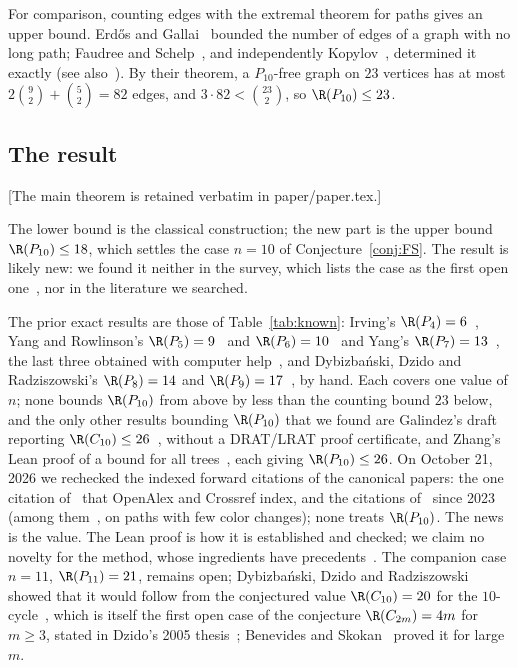 For comparison, counting edges with the extremal theorem for paths gives
an upper bound. Erdős and Gallai~\cite{EG59} bounded the number of edges
of a graph with no long path; Faudree and Schelp~\cite{FS75}, and
independently Kopylov~\cite{Kop77}, determined it exactly (see
also~\cite[Theorem~4]{DDR16}). By their theorem, a $P_{10}$-free graph on $23$ vertices has at most
$2\binom92+\binom52=82$ edges, and $3\cdot 82<\binom{23}{2}$, so
$\R(P_{10})\le 23$.

\subsection{The result}

[The main theorem is retained verbatim in paper/paper.tex.]

The lower bound is the classical construction; the new part is the upper
bound $\R(P_{10})\le18$, which settles the case $n=10$ of
Conjecture~\ref{conj:FS}. The result is likely new: we found it neither
in the survey, which lists the case as the first open
one~\cite[Section~6.4]{Rad26}, nor in the literature we searched.

The prior exact results are those of Table~\ref{tab:known}: Irving's
$\R(P_4)=6$~\cite{Irv74}, Yang and Rowlinson's $\R(P_5)=9$~\cite{YR94} and
$\R(P_6)=10$~\cite{YR92} and Yang's $\R(P_7)=13$~\cite{Yan95}, the last
three obtained with computer help~\cite[Section~2]{DDR16}, and
Dybizbański, Dzido and Radziszowski's $\R(P_8)=14$ and
$\R(P_9)=17$~\cite{DDR16}, by hand. Each covers one value of $n$; none
bounds $\R(P_{10})$ from above by less than the counting bound $23$ below,
and the only other results bounding $\R(P_{10})$ that we found are
Galindez's draft reporting $\R(C_{10})\le26$~\cite{Gal26}, without a
DRAT/LRAT proof certificate, and Zhang's Lean
proof of a bound for all trees~\cite{ZhJ26}, each giving
$\R(P_{10})\le26$. On October
21, 2026 we rechecked the indexed forward citations of the canonical
papers: the one citation of~\cite{DDR16} that OpenAlex and Crossref
index, and the citations
of~\cite{GRSS07} since 2023 (among them~\cite{ABC+26}, on paths with few
color changes); none treats $\R(P_{10})$. The news is the value. The Lean
proof is how it is established and checked; we claim no novelty for the
method, whose ingredients have precedents~\cite{HKWB12,HS24,SNG+24,Sze26}.
The companion case $n=11$, $\R(P_{11})=21$, remains open; Dybizbański,
Dzido and Radziszowski showed that it would follow from the conjectured
value $\R(C_{10})=20$ for the $10$-cycle~\cite{DDR16}, which is itself the
first open case of the conjecture $\R(C_{2m})=4m$ for $m\ge3$, stated in
Dzido's 2005 thesis~\cite[Section~6.3.1(b)]{Rad26}; Benevides and
Skokan~\cite{BS09} proved it for large $m$.

